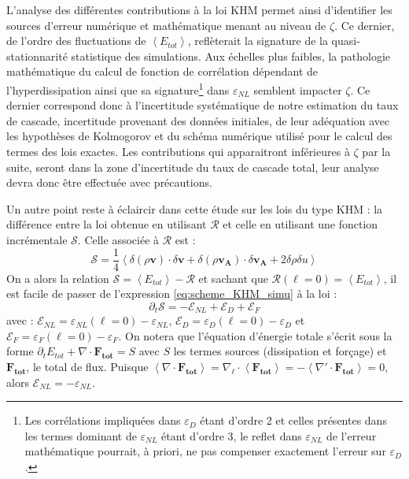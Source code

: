 L'analyse des différentes contributions à la loi \acs{KHM} permet ainsi d'identifier les sources d'erreur numérique et mathématique menant au niveau de $\zeta$. Ce dernier, de l'ordre des fluctuations de $\left< E_{tot}\right>$, reflèterait la signature de la quasi-stationnarité statistique des simulations. Aux échelles plus faibles, la pathologie mathématique du calcul de fonction de corrélation dépendant de l'hyperdissipation ainsi que sa signature\footnote{Les corrélations impliquées dans $\varepsilon_{D}$ étant d'ordre 2 et celles présentes dans les termes dominant de $\varepsilon_{NL}$ étant d'ordre 3, le reflet dans $\varepsilon_{NL}$ de l'erreur mathématique pourrait, à priori, ne pas compenser exactement l'erreur sur $\varepsilon_{D}$. } dans $\varepsilon_{NL}$ semblent impacter $\zeta$. Ce dernier correspond donc à l'incertitude systématique de notre estimation du taux de cascade, incertitude provenant des données initiales, de leur adéquation avec les hypothèses de Kolmogorov et du schéma numérique utilisé pour le calcul des termes des lois exactes. Les contributions qui apparaitront inférieures à $\zeta$ par la suite, seront dans la zone d'incertitude du taux de cascade total, leur analyse devra donc être effectuée avec précautions. 

Un autre point reste à éclaircir dans cette étude sur les lois du type \acs{KHM} : la différence entre la loi obtenue en utilisant $\mathcal{R}$ et celle en utilisant une fonction incrémentale $\mathcal{S}$. Celle associée à $\mathcal{R}$ est :
\begin{equation}
   \label{eq:scheme_khms} \mathcal{S} = \frac{1}{4} \left< \delta (\rho \boldsymbol{v}) \cdot \delta \boldsymbol{v} + \delta (\rho \boldsymbol{v_A}) \cdot \delta \boldsymbol{v_A}  + 2 \delta \rho \delta u \right>
\end{equation}
On a alors la relation $\mathcal{S} = \left<E_{tot}\right> - \mathcal{R}$ et sachant que $\mathcal{R}(\boldsymbol{\ell} = 0) = \left<E_{tot}\right>$, il est facile de passer de l'expression \eqref{eq:scheme_KHM_simu} à la loi :
\begin{equation}
 \label{eq:scheme_KHMS_simu}   \partial_t \mathcal{S} = - \mathcal{E}_{NL} + \mathcal{E}_{D} + \mathcal{E}_{F}
\end{equation}
avec : $\mathcal{E}_{NL} = \varepsilon_{NL}(\boldsymbol{\ell} = 0) - \varepsilon_{NL}$, $\mathcal{E}_{D} = \varepsilon_{D}(\boldsymbol{\ell} = 0) - \varepsilon_{D}$ et $\mathcal{E}_{F} = \varepsilon_{F}(\boldsymbol{\ell} = 0) - \varepsilon_{F}$. On notera que l'équation d'énergie totale s'écrit sous la forme $\partial_t E_{tot} + \nabla \cdot \boldsymbol{F_{tot}} = S$ avec $S$ les termes sources (dissipation et forçage) et $\boldsymbol{F_{tot}}$, le total de flux. Puisque $\left<  \nabla \cdot \boldsymbol{F_{tot}} \right> = \nabla_{\boldsymbol{\ell}} \cdot \left< \boldsymbol{F_{tot}} \right> = - \left<  \nabla' \cdot \boldsymbol{F_{tot}} \right> = 0$, alors $\mathcal{E}_{NL} =  - \varepsilon_{NL}$.

